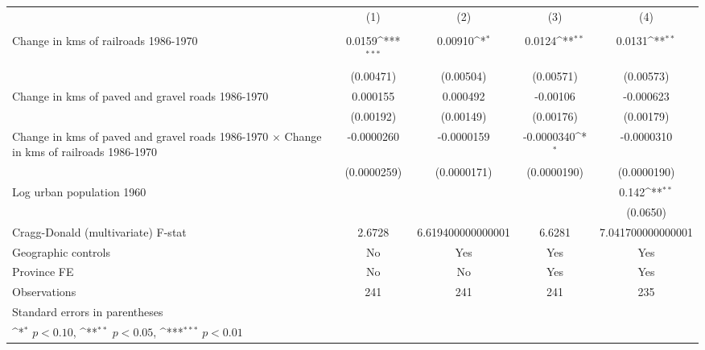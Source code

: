 {
\def\sym#1{\ifmmode^{#1}\else\(^{#1}\)\fi}
\begin{tabular}{l*{4}{c}}
\hline\hline
                &\multicolumn{1}{c}{(1)}&\multicolumn{1}{c}{(2)}&\multicolumn{1}{c}{(3)}&\multicolumn{1}{c}{(4)}\\
                &\multicolumn{1}{c}{}&\multicolumn{1}{c}{}&\multicolumn{1}{c}{}&\multicolumn{1}{c}{}\\
\hline
Change in kms of railroads 1986-1970&   0.0159\sym{***}&  0.00910\sym{*}  &   0.0124\sym{**} &   0.0131\sym{**} \\
                &(0.00471)         &(0.00504)         &(0.00571)         &(0.00573)         \\
[1em]
Change in kms of paved and gravel roads 1986-1970& 0.000155         & 0.000492         & -0.00106         &-0.000623         \\
                &(0.00192)         &(0.00149)         &(0.00176)         &(0.00179)         \\
[1em]
Change in kms of paved and gravel roads 1986-1970 $\times$ Change in kms of railroads 1986-1970&-0.0000260         &-0.0000159         &-0.0000340\sym{*}  &-0.0000310         \\
                &(0.0000259)         &(0.0000171)         &(0.0000190)         &(0.0000190)         \\
[1em]
Log urban population 1960&                  &                  &                  &    0.142\sym{**} \\
                &                  &                  &                  & (0.0650)         \\
\hline
Cragg-Donald (multivariate) F-stat&   2.6728         &6.619400000000001         &   6.6281         &7.041700000000001         \\
Geographic controls&       No         &      Yes         &      Yes         &      Yes         \\
Province FE     &       No         &       No         &      Yes         &      Yes         \\
Observations    &      241         &      241         &      241         &      235         \\
\hline\hline
\multicolumn{5}{l}{\footnotesize Standard errors in parentheses}\\
\multicolumn{5}{l}{\footnotesize \sym{*} \(p<0.10\), \sym{**} \(p<0.05\), \sym{***} \(p<0.01\)}\\
\end{tabular}
}
